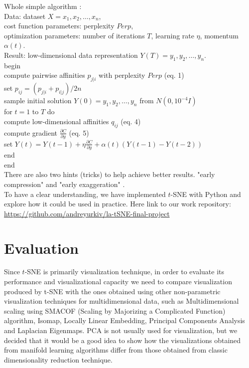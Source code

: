 Whole simple algorithm \cite{tsnearticle}:\\
Data: dataset $X = {x_1, x_2, \dots, x_n}$,\\
cost function parameters: perplexity $Perp$,\\
optimization parameters: number of iterations $T$, learning rate $\eta$, momentum $\alpha(t)$.\\
Result: low-dimensional data representation $Y(T) = {y_1, y_2, \dots, y_n}$.\\
begin\\
\hspace*{1cm}compute pairwise affinities $p_{j|i}$ with perplexity $Perp$ (eq. 1)\\
\hspace*{1cm}set $p_{ij} = (p_{j|i} + p_{i|j})/2n$\\
\hspace*{1cm}sample initial solution $Y(0) = {y_1, y_2, \dots, y_n}$ from $N(0, 10^{-4}I)$\\
\hspace*{1cm}for $t = 1$ to $T$ do\\
\hspace*{2cm}compute low-dimensional affinities $q_{ij}$ (eq. 4)\\
\hspace*{2cm}compute gradient $\frac{\partial C}{\partial y}$ (eq. 5)\\
\hspace*{2cm}set $Y(t) = Y(t-1) + \eta \frac{\partial C}{\partial y} + \alpha(t)(Y(t-1) - Y(t-2))$\\
\hspace*{1cm}end\\
end\\

There are also two hints (tricks) to help achieve better results. "early compression" and "early exaggeration" \cite{tsnearticle}.\\

To have a clear understanding, we have implemented $t$-SNE with Python and explore how it could be used in practice. Here link to our work repository:\\

\url{https://github.com/andreyurkiv/la-tSNE-final-project}

\section{Evaluation}

Since $t$-SNE is primarily visualization technique, in order to evaluate its performance and visualizational capacity we need to compare visualization produced by t-SNE with the ones obtained using other non-parametric visualization techniques for multidimensional data, such as Multidimensional scaling using SMACOF (Scaling by Majorizing a Complicated Function) algorithm, Isomap, Locally Linear Embedding, Principal Components Analysis and Laplacian Eigenmaps. PCA is not usually used for visualization, but we decided that it would be a good idea to show how the visualizations obtained from manifold learning algorithms differ from those obtained from classic dimensionality reduction technique.


